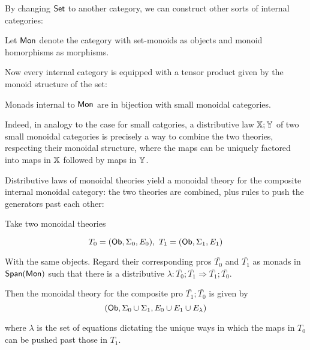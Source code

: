 

By changing $\mathsf{Set}$ to another category, we can construct other sorts of internal categories: 

\begin{definition}
\label{def:monoid}
Let ${\sf Mon}$ denote the category with set-monoids as objects and monoid homorphisms as morphisms.
\end{definition}

Now every internal category is equipped with a tensor product given by the monoid structure of the set:


\begin{lemma}
\label{def:internalmonoidalcat}

Monads internal to ${\sf Mon}$ are in bijection with small monoidal categories.
\end{lemma}

Indeed, in analogy to the case for small catgories, a distributive law $\mathbb{X};\mathbb{Y}$ of two small monoidal categories is precisely a way to combine the two theories, respecting their monoidal structure,  where the maps can be uniquely factored into maps in $\mathbb{X}$ followed by maps in $\mathbb{Y}$.

Distributive laws of monoidal theories yield a monoidal theory for the composite internal monoidal category:  the two theories are combined,  plus rules to push the generators past each other:

\begin{lemma}[{\cite[????]{????}}]
Take two monoidal theories

$$
T_0=({\sf Ob},\Sigma_0 ,E_0 ), \ T_1=({\sf Ob},\Sigma_1 ,E_1 )
$$

With the same objects.  Regard their corresponding pros $\bar{T_0}$ and $\bar{T_1}$ as monads in $\mathsf{Span}({\sf Mon})$ such that there is a distributive $\lambda:\bar{T_0};\bar{T_1} \Rightarrow \bar{T_1};\bar{T_0}$.


Then the monoidal theory for the composite pro $\bar{T_1};\bar{T_0}$ is given by 
$$
({\sf Ob}, \Sigma_0\cup \Sigma_1, E_0\cup E_1 \cup E_\lambda)
$$

where $\lambda$ is the set of equations dictating the unique ways in which the maps in $T_0$ can be pushed past those in $T_1$.
\end{lemma}


